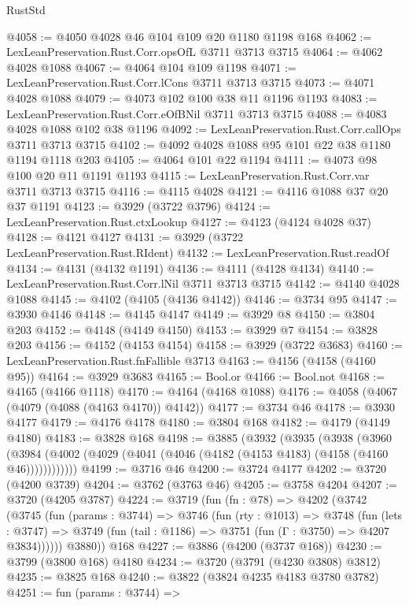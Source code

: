 \begin{lexlean}{RustStd}
\begin{coremodule}
@4058 := @4050 @4028 @46 @104 @109 @20 @1180 @1198 @168
@4062 := LexLeanPreservation.Rust.Corr.opsOfL @3711 @3713 @3715
@4064 := @4062 @4028 @1088
@4067 := @4064 @104 @109 @1198
@4071 := LexLeanPreservation.Rust.Corr.lCons @3711 @3713 @3715
@4073 := @4071 @4028 @1088
@4079 := @4073 @102 @100 @38 @11 @1196 @1193
@4083 := LexLeanPreservation.Rust.Corr.eOfBNil @3711 @3713 @3715
@4088 := @4083 @4028 @1088 @102 @38 @1196
@4092 := LexLeanPreservation.Rust.Corr.callOps @3711 @3713 @3715
@4102 := @4092 @4028 @1088 @95 @101 @22 @38 @1180 @1194 @1118 @203
@4105 := @4064 @101 @22 @1194
@4111 := @4073 @98 @100 @20 @11 @1191 @1193
@4115 := LexLeanPreservation.Rust.Corr.var @3711 @3713 @3715
@4116 := @4115 @4028
@4121 := @4116 @1088 @37 @20 @37 @1191
@4123 := @3929 (@3722 @3796)
@4124 := LexLeanPreservation.Rust.ctxLookup
@4127 := @4123 (@4124 @4028 @37)
@4128 := @4121 @4127
@4131 := @3929 (@3722 LexLeanPreservation.Rust.RIdent)
@4132 := LexLeanPreservation.Rust.readOf
@4134 := @4131 (@4132 @1191)
@4136 := @4111 (@4128 @4134)
@4140 := LexLeanPreservation.Rust.Corr.lNil @3711 @3713 @3715
@4142 := @4140 @4028 @1088
@4145 := @4102 (@4105 (@4136 @4142))
@4146 := @3734 @95
@4147 := @3930 @4146
@4148 := @4145 @4147
@4149 := @3929 @8
@4150 := @3804 @203
@4152 := @4148 (@4149 @4150)
@4153 := @3929 @7
@4154 := @3828 @203
@4156 := @4152 (@4153 @4154)
@4158 := @3929 (@3722 @3683)
@4160 := LexLeanPreservation.Rust.fnFallible @3713
@4163 := @4156 (@4158 (@4160 @95))
@4164 := @3929 @3683
@4165 := Bool.or
@4166 := Bool.not
@4168 := @4165 (@4166 @1118)
@4170 := @4164 (@4168 @1088)
@4176 := @4058 (@4067 (@4079 (@4088 (@4163 @4170)) @4142))
@4177 := @3734 @46
@4178 := @3930 @4177
@4179 := @4176 @4178
@4180 := @3804 @168
@4182 := @4179 (@4149 @4180)
@4183 := @3828 @168
@4198 := @3885
    (@3932
      (@3935
        (@3938
          (@3960
            (@3984 (@4002 (@4029 (@4041 (@4046 (@4182 (@4153 @4183) (@4158 (@4160 @46))))))))))))
@4199 := @3716 @46
@4200 := @3724 @4177
@4202 := @3720 (@4200 @3739)
@4204 := @3762 (@3763 @46)
@4205 := @3758 @4204
@4207 := @3720 (@4205 @3787)
@4224 := @3719
    (fun (fn : @78) =>
    @4202
      (@3742
        (@3745
          (fun (params : @3744) =>
          @3746
            (fun (rty : @1013) =>
            @3748
              (fun (lets : @3747) =>
              @3749 (fun (tail : @1186) => @3751 (fun (Γ : @3750) => @4207 @3834))))))
        @3880))
    @168
@4227 := @3886 (@4200 (@3737 @168))
@4230 := @3799 (@3800 @168) @4180
@4234 := @3720 (@3791 (@4230 @3808) @3812)
@4235 := @3825 @168
@4240 := @3822 (@3824 @4235 @4183 @3780 @3782)
@4251 := fun (params : @3744) =>

\end{coremodule}
\end{lexlean}

